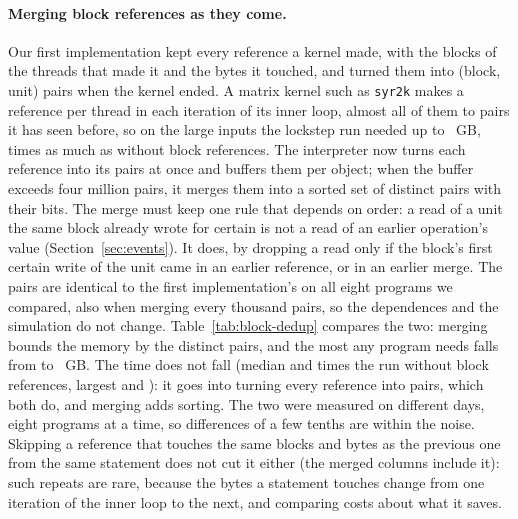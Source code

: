 \documentclass[11pt]{article}
\newcommand{\secref}[1]{Section~\ref{#1}}
\newcommand{\tabref}[1]{Table~\ref{#1}}
\newcommand{\code}[1]{\texttt{#1}}
\begin{document}
\paragraph{Merging block references as they come.} Our first implementation kept every reference a kernel
made, with the blocks of the threads that made it and the bytes it touched, and turned them into (block, unit)
pairs when the kernel ended. A matrix kernel such as \code{syr2k} makes a reference per thread in each iteration
of its inner loop, almost all of them to pairs it has seen before, so on the large inputs the lockstep run needed
up to \numDedupLargeKeptMaxGB{}~GB, \numDedupLargeKeptMemMax{} times as much as without block references. The
interpreter now turns each reference into its pairs at once and buffers them per object; when the buffer exceeds
four million pairs, it merges them into a sorted set of distinct pairs with their bits. The merge must keep one
rule that depends on order: a read of a unit the same block already wrote for certain is not a read of an earlier
operation's value (\secref{sec:events}). It does, by dropping a read only if the block's first certain write of
the unit came in an earlier reference, or in an earlier merge. The pairs are identical to the first
implementation's on all eight programs we compared, also when merging every thousand pairs, so the dependences and
the simulation do not change. \tabref{tab:block-dedup} compares the two: merging bounds the memory by the distinct
pairs, and the most any program needs falls from \numDedupLargeKeptMaxGB{} to \numDedupLargeMergedMaxGB{}~GB. The
time does not fall (median \numDedupLargeKeptTimeMed{} and \numDedupLargeMergedTimeMed{} times the run without
block references, largest \numDedupLargeKeptTimeMax{} and \numDedupLargeMergedTimeMax{}): it goes into turning every
reference into pairs, which both do, and merging adds sorting. The two were measured on different days, eight
programs at a time, so differences of a few tenths are within the noise. Skipping a reference that touches the
same blocks and bytes as the previous one from the same statement does not cut it either (the merged columns
include it): such repeats are rare, because the bytes a statement touches change from one iteration of the
inner loop to the next, and comparing costs about what it saves.

\begin{table}[tbp]
\centering
\footnotesize
\setlength{\tabcolsep}{4pt}

\caption{Block references kept until the kernel ends against merged as they come: the lockstep run with block
references against the run without them, and the peak memory of the five programs that needed the most before.}
\label{tab:block-dedup}
\end{table}
\end{document}
